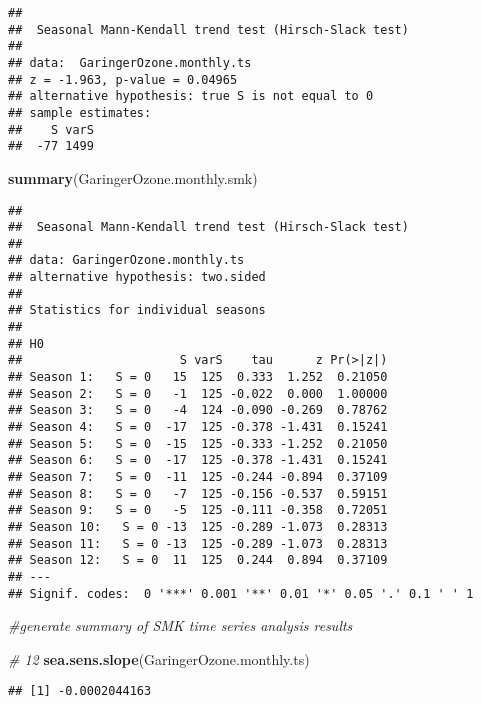 \documentclass[
]{article}
\newenvironment{Shaded}{\begin{snugshade}}{\end{snugshade}}
\newcommand{\CommentTok}[1]{\textcolor[rgb]{0.56,0.35,0.01}{\textit{#1}}}
\newcommand{\KeywordTok}[1]{\textcolor[rgb]{0.13,0.29,0.53}{\textbf{#1}}}
\newcommand{\NormalTok}[1]{#1}
\begin{document}
\begin{verbatim}
## 
##  Seasonal Mann-Kendall trend test (Hirsch-Slack test)
## 
## data:  GaringerOzone.monthly.ts
## z = -1.963, p-value = 0.04965
## alternative hypothesis: true S is not equal to 0
## sample estimates:
##    S varS 
##  -77 1499
\end{verbatim}

\begin{Shaded}
\begin{Highlighting}[]
\KeywordTok{summary}\NormalTok{(GaringerOzone.monthly.smk)}
\end{Highlighting}
\end{Shaded}

\begin{verbatim}
## 
##  Seasonal Mann-Kendall trend test (Hirsch-Slack test)
## 
## data: GaringerOzone.monthly.ts
## alternative hypothesis: two.sided
## 
## Statistics for individual seasons
## 
## H0
##                      S varS    tau      z Pr(>|z|)  
## Season 1:   S = 0   15  125  0.333  1.252  0.21050  
## Season 2:   S = 0   -1  125 -0.022  0.000  1.00000  
## Season 3:   S = 0   -4  124 -0.090 -0.269  0.78762  
## Season 4:   S = 0  -17  125 -0.378 -1.431  0.15241  
## Season 5:   S = 0  -15  125 -0.333 -1.252  0.21050  
## Season 6:   S = 0  -17  125 -0.378 -1.431  0.15241  
## Season 7:   S = 0  -11  125 -0.244 -0.894  0.37109  
## Season 8:   S = 0   -7  125 -0.156 -0.537  0.59151  
## Season 9:   S = 0   -5  125 -0.111 -0.358  0.72051  
## Season 10:   S = 0 -13  125 -0.289 -1.073  0.28313  
## Season 11:   S = 0 -13  125 -0.289 -1.073  0.28313  
## Season 12:   S = 0  11  125  0.244  0.894  0.37109  
## ---
## Signif. codes:  0 '***' 0.001 '**' 0.01 '*' 0.05 '.' 0.1 ' ' 1
\end{verbatim}

\begin{Shaded}
\begin{Highlighting}[]
  \CommentTok{#generate summary of SMK time series analysis results}

\CommentTok{# 12}
\KeywordTok{sea.sens.slope}\NormalTok{(GaringerOzone.monthly.ts)}
\end{Highlighting}
\end{Shaded}

\begin{verbatim}
## [1] -0.0002044163
\end{verbatim}
\end{document}
